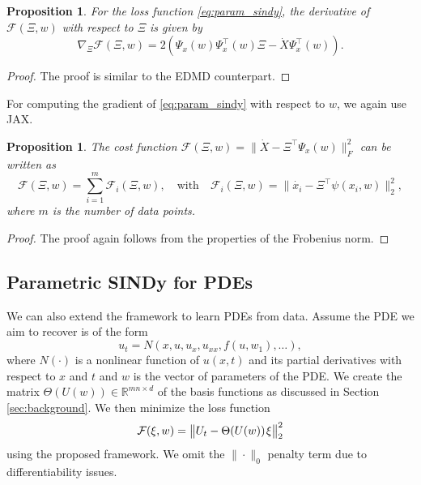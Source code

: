 \documentclass
[
    a4paper,
    DIV=11,
    abstract=true,
    11pt,
]
{scrartcl}
\newcommand{\R}{\mathbb{R}}                                      %
\newcommand{\ts}{\hspace*{0.1em}}                                %
\newtheorem{proposition}[theorem]{Proposition}
\theoremstyle{definition}
\begin{document}
\begin{proposition}
For the loss function \eqref{eq:param_sindy}, the derivative of $\mathcal{F}(\Xi, w)$ with respect to $ \Xi $ is given by
\begin{equation*}
    \nabla_{\Xi} \mathcal{F}(\Xi, w) = 2(\Psi_x(w) \Psi_x^{\top}(w) \Xi - \dot{X} \Psi_x^{\top}(w)).
\end{equation*}
\end{proposition}
\begin{proof}
The proof is similar to the EDMD counterpart.
\end{proof}

For computing the gradient of \eqref{eq:param_sindy} with respect to $w$, we again use JAX.

\begin{proposition}
The cost function $\mathcal{F}(\Xi, w) = \big\|\dot{X} - \Xi^{\top}\Psi_x(w)\big\|_F^2$ can be written as
\begin{equation*}
    \mathcal{F}(\Xi, w) = \sum_{i=1}^m \mathcal{F}_i(\Xi, w),
    \quad \text{with} \quad
    \mathcal{F}_i(\Xi, w) = \big\|\dot{x_i} - \Xi^{\top} \psi(x_i, w)\big\|_2^2,
\end{equation*}
where $m$ is the number of data points.
\end{proposition}

\begin{proof}
The proof again follows from the properties of the Frobenius norm.
\end{proof}

\subsection{Parametric SINDy for PDEs}

We can also extend the framework to learn PDEs from data. Assume the PDE we aim to recover is of the form
\begin{equation*}
    u_t = N(x, u, u_x, u_{xx}, f(u, w_1), \dots),
\end{equation*}
where $N(\cdot)$ is a nonlinear function of $u(x,t)$ and its partial derivatives with respect to $x$ and $t$ and $w$ is the vector of parameters of the PDE. We create the matrix $\Theta(U(w)) \in \R^{mn \times d}$ of the basis functions as discussed in Section \ref{sec:background}. We then minimize the loss function
\begin{equation} \label{eq:param_pde_loss}
    \mathcal{F}(\xi, w) =  \big\|U_t - \Theta(U(w)) \ts \xi\big\|_2^2
\end{equation}
using the proposed framework. We omit the $\| \cdot \|_0$ penalty term due to differentiability issues.
\end{document}
